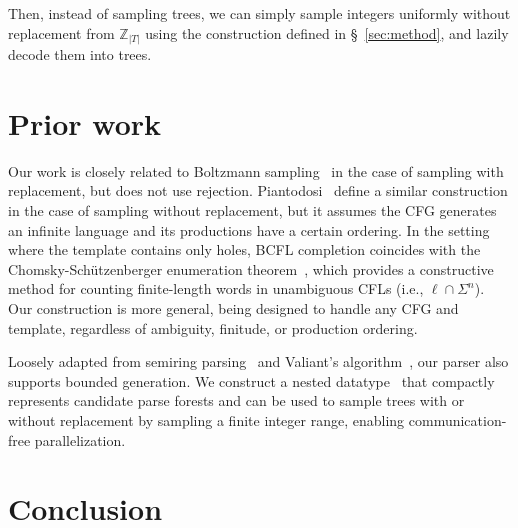 \documentclass[sigplan,nonacm]{acmart}\settopmatter{printfolios=false,printccs=false,printacmref=false}
\begin{document}
\begin{small}
\begin{small}
Then, instead of sampling trees, we can simply sample integers uniformly without replacement from $\mathbb{Z}_{|T|}$ using the construction defined in \S~\ref{sec:method}, and lazily decode them into trees.

%
%


  \section{Prior work}

  Our work is closely related to Boltzmann sampling~\cite{duchon2004boltzmann} in the case of sampling with replacement, but does not use rejection. Piantodosi~\cite{piantadosi2023enumerate} define a similar construction in the case of sampling without replacement, but it assumes the CFG generates an infinite language and its productions have a certain ordering. In the setting where the template contains only holes, BCFL completion coincides with the Chomsky-Sch\"utzenberger enumeration theorem~\cite{panholzer2005grobner}, which provides a constructive method for counting finite-length words in unambiguous CFLs (i.e., $\ell\cap\Sigma^n$). Our construction is more general, being designed to handle any CFG and template, regardless of ambiguity, finitude, or production ordering.

  Loosely adapted from semiring parsing~\cite{goodman1999semiring} and Valiant's algorithm~\cite{valiant1975general}, our parser also supports bounded generation. We construct a nested datatype~\cite{bird1998nested} that compactly represents candidate parse forests and can be used to sample trees with or without replacement by sampling a finite integer range, enabling communication-free parallelization. %

  \section{Conclusion}


\end{small}
\end{small}
\end{document}
